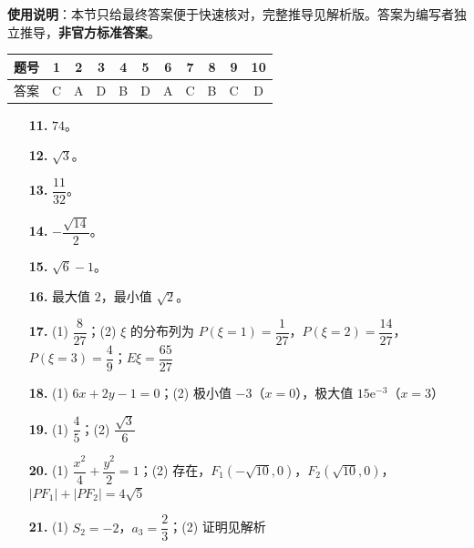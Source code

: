 
\begin{gknotice}
\textbf{使用说明}：本节只给最终答案便于快速核对，完整推导见解析版。答案为编写者独立推导，\textbf{非官方标准答案}。
\end{gknotice}

\begin{center}\begin{tabular}{ccccccccccc}
\toprule
题号 & 1 & 2 & 3 & 4 & 5 & 6 & 7 & 8 & 9 & 10 \\
\midrule
答案 & C & A & D & B & D & A & C & B & C & D \\
\bottomrule
\end{tabular}\end{center}

\begin{itemize}[leftmargin=2.6em]
  \item[\textbf{11.}] $74$。
  \item[\textbf{12.}] $\sqrt3$。
  \item[\textbf{13.}] $\dfrac{11}{32}$。
  \item[\textbf{14.}] $-\dfrac{\sqrt{14}}2$。
  \item[\textbf{15.}] $\sqrt6-1$。
\end{itemize}

\begin{itemize}[leftmargin=2.6em]
  \item[\textbf{16.}] 最大值 $2$，最小值 $\sqrt2$。
  \item[\textbf{17.}] (1) $\dfrac8{27}$；(2) $\xi$ 的分布列为 $P(\xi=1)=\dfrac1{27}$，$P(\xi=2)=\dfrac{14}{27}$，$P(\xi=3)=\dfrac49$；$E\xi=\dfrac{65}{27}$
  \item[\textbf{18.}] (1) $6x+2y-1=0$；(2) 极小值 $-3$（$x=0$），极大值 $15\mathrm e^{-3}$（$x=3$）
  \item[\textbf{19.}] (1) $\dfrac45$；(2) $\dfrac{\sqrt3}6$
  \item[\textbf{20.}] (1) $\dfrac{x^2}4+\dfrac{y^2}2=1$；(2) 存在，$F_1(-\sqrt{10},0)$，$F_2(\sqrt{10},0)$，$|PF_1|+|PF_2|=4\sqrt5$
  \item[\textbf{21.}] (1) $S_2=-2$，$a_3=\dfrac23$；(2) 证明见解析
\end{itemize}
